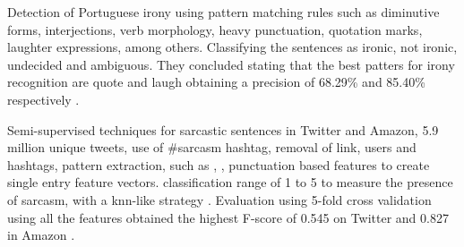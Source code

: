 Detection of Portuguese irony using pattern matching rules such as diminutive forms, interjections, verb morphology, heavy punctuation, quotation marks, laughter expressions, among others. Classifying the sentences as ironic, not ironic, undecided and ambiguous. They concluded stating that the best patters for irony recognition are quote and laugh obtaining a precision of 68.29\% and 85.40\% respectively \cite{carvalho2009clues}.

Semi-supervised techniques for sarcastic sentences in Twitter and Amazon, 5.9 million unique tweets, use of \#sarcasm hashtag, removal of link, users and hashtags, pattern extraction, such as , , punctuation based features to create single entry feature vectors. classification range of 1 to 5 to measure the presence of sarcasm, with a \acrfull{knn}-like strategy \cite{davidov2010enhanced}. Evaluation using 5-fold cross validation using all the features obtained the highest F-score of 0.545 on Twitter and 0.827 in Amazon \cite{davidov2010semi}.